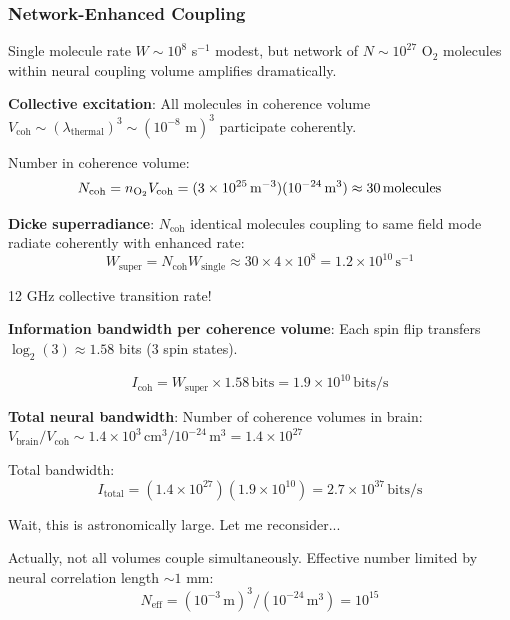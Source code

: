 \documentclass[11pt,onecolumn]{article}
\begin{document}
\subsubsection{Network-Enhanced Coupling}

Single molecule rate $W \sim 10^8$ s$^{-1}$ modest, but network of $N \sim 10^{27}$ O$_2$ molecules within neural coupling volume amplifies dramatically.

\textbf{Collective excitation}: All molecules in coherence volume $V_{\text{coh}} \sim (\lambda_{\text{thermal}})^3 \sim (10^{-8}\text{ m})^3$ participate coherently.

Number in coherence volume:
\begin{equation}
N_{\text{coh}} = n_{\ce{O2}} V_{\text{coh}} = (3 \times 10^{25}\,\text{m}^{-3})(10^{-24}\,\text{m}^3) \approx 30\,\text{molecules}
\end{equation}

\textbf{Dicke superradiance}: $N_{\text{coh}}$ identical molecules coupling to same field mode radiate coherently with enhanced rate:
\begin{equation}
W_{\text{super}} = N_{\text{coh}} W_{\text{single}} \approx 30 \times 4 \times 10^8 = 1.2 \times 10^{10}\,\text{s}^{-1}
\end{equation}

12 GHz collective transition rate!

\textbf{Information bandwidth per coherence volume}:
Each spin flip transfers $\log_2(3) \approx 1.58$ bits (3 spin states).

\begin{equation}
I_{\text{coh}} = W_{\text{super}} \times 1.58\,\text{bits} = 1.9 \times 10^{10}\,\text{bits/s}
\end{equation}

\textbf{Total neural bandwidth}:
Number of coherence volumes in brain: $V_{\text{brain}}/V_{\text{coh}} \sim 1.4 \times 10^3\,\text{cm}^3 / 10^{-24}\,\text{m}^3 = 1.4 \times 10^{27}$

Total bandwidth:
\begin{equation}
I_{\text{total}} = (1.4 \times 10^{27})(1.9 \times 10^{10}) = 2.7 \times 10^{37}\,\text{bits/s}
\end{equation}

Wait, this is astronomically large. Let me reconsider...

Actually, not all volumes couple simultaneously. Effective number limited by neural correlation length $\sim 1$ mm:
\begin{equation}
N_{\text{eff}} = (10^{-3}\,\text{m})^3 / (10^{-24}\,\text{m}^3) = 10^{15}
\end{equation}
\end{document}
